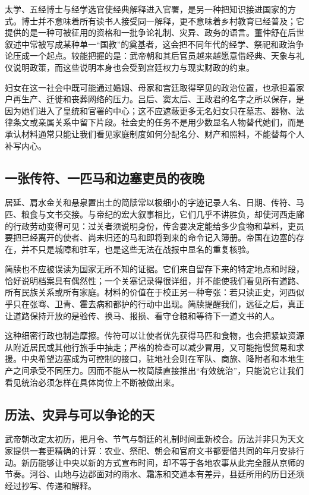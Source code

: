 太学、五经博士与经学选官使经典解释进入官署，是另一种把知识接进国家的方式。博士并不意味着所有读书人接受同一解释，更不意味着乡村教育已经普及；它提供的是一种可被征用的资格和一批争论礼制、灾异、政务的语言。董仲舒在后世叙述中常被写成某种单一“国教”的奠基者，这会把不同年代的经学、祭祀和政治争论压成一个起点。较能把握的是：武帝朝和其后官员越来越愿意借经典、天象与礼仪说明政策，而这些说明本身也会受到宫廷权力与现实财政的约束。

妇女在这一社会中既可能通过婚姻、母家和宫廷取得罕见的政治位置，也承担着家户再生产、迁徙和丧葬网络的压力。吕后、窦太后、王政君的名字之所以保存，是因为她们进入了皇统和官署的中心；这不应遮蔽更多无名妇女只在墓志、器物、法律条文或亲属关系中留下片段。社会史的任务不是用少数显名人物替代她们，而是承认材料通常只能让我们看见家庭制度如何分配名分、财产和照料，不能替每个人补写内心。

\subsection{一张传符、一匹马和边塞吏员的夜晚}

居延、肩水金关和悬泉置出土的简牍常以极细小的字迹记录人名、日期、传符、马匹、粮食与文书交接。与帝纪的宏大叙事相比，它们几乎不讲胜负，却使河西走廊的行政劳动变得可见：过关者须说明身份，传舍要决定能给多少食物和草料，吏员要把已经离开的使者、尚未归还的马和即将到来的命令记入簿册。帝国在边塞的存在，并不只是城障和驻军，也是这些无法在战报中显名的重复核验。

简牍也不应被误读为国家无所不知的证据。它们来自留存下来的特定地点和时段，恰好说明档案具有偶然性；一个关塞记录得很详细，并不能使我们看见所有道路、所有民族关系或所有家庭。材料的价值在于校正另一种夸张：若只读正史，河西似乎只在张骞、卫青、霍去病和都护的行动中出现。简牍提醒我们，远征之后，真正让道路保持开放的是验传、换马、报损、看守仓粮和等待下一道文书的人。

这种细密行政也制造摩擦。传符可以让使者优先获得马匹和食物，也会把紧缺资源从附近居民或其他行旅手中抽走；严格的检查可以减少冒用，又可能拖慢贸易和求援。中央希望边塞成为可控制的接口，驻地社会则在军队、商旅、降附者和本地生产之间承受不同压力。因而不能从一枚简牍直接推出“有效统治”，只能说它让我们看见统治必须怎样在具体岗位上不断被做出来。

\subsection{历法、灾异与可以争论的天}

武帝朝改定太初历，把月令、节气与朝廷的礼制时间重新校合。历法并非只为天文家提供一套更精确的计算：农业、祭祀、朝会和官府文书都要借共同的年月安排行动。新历能够让中央以新的方式宣布时间，却不等于各地农事从此完全服从京师的节奏。河谷、山地与边郡面对的雨水、霜冻和交通本有差异，县廷所用的历日还须经过抄写、传递和解释。

